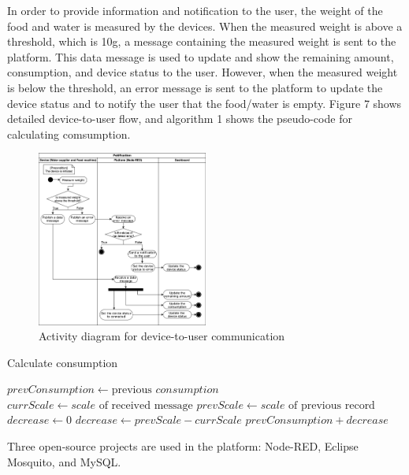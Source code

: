 ﻿\documentclass[conference]{IEEEtran}
\begin{document}
In order to provide information and notification to the user, the weight of the food and water is measured by the devices.
When the measured weight is above a threshold, which is 10g, a message containing the measured weight is sent to the platform.
This data message is used to update and show the remaining amount, consumption, and device status to the user.
However, when the measured weight is below the threshold, an error message is sent to the platform to update the device status and to notify the user that the food/water is empty.
Figure 7 shows detailed device-to-user flow, and algorithm 1 shows the pseudo-code for calculating comsumption.

\begin{figure}[htbp]
\centerline{\includegraphics[width=0.5\textwidth]{./images/device2user.png}}
\caption{Activity diagram for device-to-user communication}
\label{fig}
\end{figure}

\begin{algorithm}
\caption{Calculate consumption}\label{algo}
\begin{algorithmic}[1]
        \State $prevConsumption \gets \text{previous } \textit{consumption}$
        \State $currScale \gets \textit{scale} \text{ of received message}$
        \State $prevScale \gets \textit{scale} \text{ of  previous record}$
        \State $decrease \gets 0$
            \State $decrease \gets prevScale - currScale$
        \EndIf
        \Return $prevConsumption + decrease$
    \EndProcedure
\end{algorithmic}
\end{algorithm}

Three open-source projects are used in the platform: Node-RED, Eclipse Mosquito, and MySQL.
\end{document}
